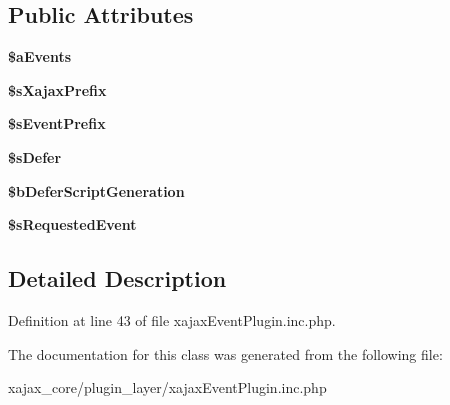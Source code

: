 \subsection*{Public Attributes}
\begin{DoxyCompactItemize}
\item 
\hypertarget{classxajaxEventPlugin_a7f06e62bf0469bcc33549e6203190a9b}{
{\bfseries \$aEvents}}
\label{classxajaxEventPlugin_a7f06e62bf0469bcc33549e6203190a9b}

\item 
\hypertarget{classxajaxEventPlugin_a2af7dd5c939e684e3eaa3804752e683f}{
{\bfseries \$sXajaxPrefix}}
\label{classxajaxEventPlugin_a2af7dd5c939e684e3eaa3804752e683f}

\item 
\hypertarget{classxajaxEventPlugin_ac4352c55aed74cf76f0e0c76709eaa2b}{
{\bfseries \$sEventPrefix}}
\label{classxajaxEventPlugin_ac4352c55aed74cf76f0e0c76709eaa2b}

\item 
\hypertarget{classxajaxEventPlugin_a2c93f9285f9ef710360172e436246caf}{
{\bfseries \$sDefer}}
\label{classxajaxEventPlugin_a2c93f9285f9ef710360172e436246caf}

\item 
\hypertarget{classxajaxEventPlugin_a68e0382db9770d5c0dcf1bcb5a1c6ed8}{
{\bfseries \$bDeferScriptGeneration}}
\label{classxajaxEventPlugin_a68e0382db9770d5c0dcf1bcb5a1c6ed8}

\item 
\hypertarget{classxajaxEventPlugin_aa78c5847bc168fbe1d9ba0b7af015097}{
{\bfseries \$sRequestedEvent}}
\label{classxajaxEventPlugin_aa78c5847bc168fbe1d9ba0b7af015097}

\end{DoxyCompactItemize}


\subsection{Detailed Description}


Definition at line 43 of file xajaxEventPlugin.inc.php.



The documentation for this class was generated from the following file:\begin{DoxyCompactItemize}
\item 
xajax\_\-core/plugin\_\-layer/xajaxEventPlugin.inc.php\end{DoxyCompactItemize}
